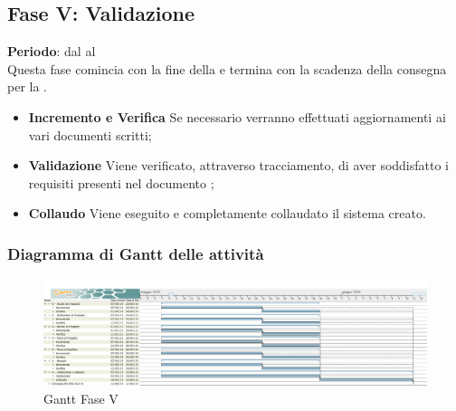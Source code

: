 \subsection{Fase V: Validazione}
	\textbf{Periodo}: dal  al  \\Questa fase comincia con la fine della  e termina con la scadenza della consegna per la .
	\begin{itemize}
		\item \textbf{Incremento e Verifica} Se necessario verranno effettuati aggiornamenti ai vari documenti scritti;
		\item \textbf{Validazione} Viene verificato, attraverso tracciamento, di aver soddisfatto i requisiti presenti nel documento ;
		\item \textbf{Collaudo} Viene eseguito e completamente collaudato il sistema creato.
	\end{itemize}
	\subsubsection{Diagramma di Gantt delle attività}
		\begin{figure}[H]\centering
			\includegraphics[width=\textwidth]{PianoDiProgetto/Pics/FaseV.png}
		\caption{Gantt Fase V}
\end{figure}
